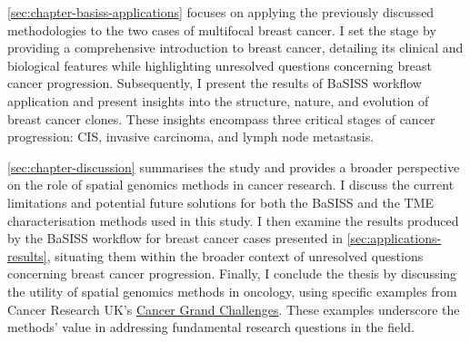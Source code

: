 \cref{sec:chapter-basiss-applications} focuses on applying the previously discussed methodologies to the two cases of multifocal breast cancer. I set the stage by providing a comprehensive introduction to breast cancer, detailing its clinical and biological features while highlighting unresolved questions concerning breast cancer progression. Subsequently, I present the results of \ac{BaSISS} workflow application and present insights into the structure, nature, and evolution of breast cancer clones. These insights encompass three critical stages of cancer progression: \acl{CIS}, invasive carcinoma, and lymph node metastasis.

\cref{sec:chapter-discussion} summarises the study and provides a broader perspective on the role of spatial genomics methods in cancer research. I discuss the current limitations and potential future solutions for both the \ac{BaSISS} and the \ac{TME} characterisation methods used in this study. I then examine the results produced by the \ac{BaSISS} workflow for breast cancer cases presented in \cref{sec:applications-results}, situating them within the broader context of unresolved questions concerning breast cancer progression. Finally, I conclude the thesis by discussing the utility of spatial genomics methods in oncology, using specific examples from Cancer Research UK's \href{https://cancergrandchallenges.org/}{Cancer Grand Challenges}. These examples underscore the methods' value in addressing fundamental research questions in the field.